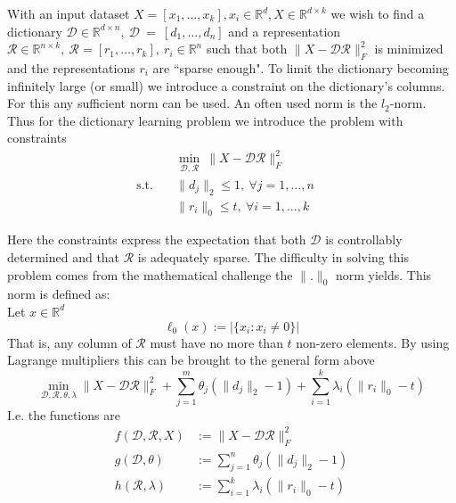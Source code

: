 \documentclass{article}
\newcommand{\R}{\mathbb{R}}
\newcommand{\Rr}{\mathcal{R}}
\newcommand{\D}{\mathcal{D}}
\begin{document}
\noindent With an input dataset $X=[x_1, \dots, x_k],  x_i \in \R^d,  X \in \R^{d\times k}$ we wish to find a dictionary $\D \in \R^{d\times n}, \   \D~=~[d_1, \dots, d_n]$ and a representation $\Rr \in\R^{n\times k}, \ \Rr = [r_1,\dots,r_k], \ r_i\in\R^n $  such that both $\|X-\D\Rr\|_F^2$ is minimized and the representations $r_i$ are ``sparse enough". To limit the dictionary becoming infinitely large (or small) we introduce a constraint on the dictionary's columns. For this any sufficient norm can be used. An often used norm is the $l_2$-norm. 
Thus for the dictionary learning problem we introduce the problem with constraints
\begin{align*}
         &\min_{\D, \Rr} \ \|X  -\D \Rr\|_F^2   \quad   \\
         \text{s.t.}  \quad  &\|d_j\|_2 \leq 1, \ \forall j=1, ...,n  \quad \\
          \quad  &\|r_i\|_0 \leq t,  \ \forall i=1, ...,k  \quad 
\end{align*}

\noindent Here the constraints express the expectation that both $\D$ is controllably determined and that $\Rr$ is adequately sparse. The difficulty in solving this problem comes from the mathematical challenge the $\| . \|_0$ norm yields. This norm is defined as:\\ 

\qquad\qquad\qquad\qquad Let $x \in \R^d$
\[
\ell_0(x) := \big|\{x_i : x_i \not= 0\}\big|
\]That is, any column of $\Rr$ must have no more than $t$ non-zero elements. By using Lagrange multipliers this can be brought to the general form above
\[
\min_{\D, \Rr, \theta, \lambda} \|X  -\D\Rr\|_F^2 + \sum_{j=1}^m \theta_j (\| d_j\|_2 - 1)+ \sum_{i=1}^k \lambda_i (\| r_i \|_0 - t)
\]
I.e. the functions are
\[
\begin{split}
f(\D, \Rr, X) &:= \| X -\D \Rr \|_F^2 \\
g(\D, \theta) &:= \sum_{j=1}^n \theta_j (\| d_j\|_2 - 1) \\
h(\Rr, \lambda) &:= \sum_{i=1}^k \lambda_i (\| r_i \|_0 - t)
\end{split}
\]
\end{document}
